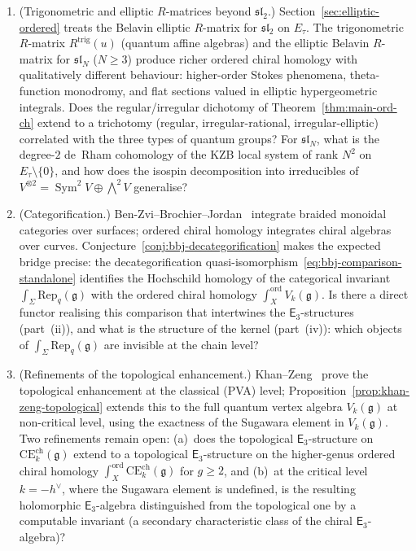\documentclass[11pt,reqno]{amsart}
\theoremstyle{definition}
\theoremstyle{remark}
\newcommand{\CE}{\mathrm{CE}}
\newcommand{\Ethree}{\mathsf{E}_{3}}
\newcommand{\fg}{\mathfrak{g}}
\numberwithin{equation}{section}
\begin{document}
\begin{enumerate}[label=\textup{(\alph*)}]
\item \textup{(Trigonometric and elliptic $R$-matrices
beyond $\mathfrak{sl}_2$.)}
Section~\ref{sec:elliptic-ordered} treats the Belavin
elliptic $R$-matrix for $\mathfrak{sl}_2$ on $E_\tau$.
The trigonometric $R$-matrix
$R^{\mathrm{trig}}(u)$ (quantum affine
algebras) and the elliptic Belavin $R$-matrix for
$\mathfrak{sl}_N$ ($N \geq 3$) produce richer ordered
chiral homology with qualitatively different behaviour:
higher-order Stokes phenomena, theta-function monodromy,
and flat sections valued in elliptic hypergeometric
integrals.
Does the regular/irregular dichotomy of
Theorem~\ref{thm:main-ord-ch} extend to a trichotomy
(regular, irregular-rational, irregular-elliptic)
correlated with the three types of quantum groups?
For $\mathfrak{sl}_N$, what is the degree-$2$ de~Rham
cohomology of the KZB local system of rank $N^2$ on
$E_\tau \setminus \{0\}$, and how does the isospin
decomposition into irreducibles of
$V^{\otimes 2} = \operatorname{Sym}^2 V \oplus
\bigwedge^2 V$ generalise?

\item \textup{(Categorification.)}
Ben-Zvi--Brochier--Jordan~\cite{BBJ15,BBJ16} integrate
braided monoidal categories over surfaces; ordered chiral
homology integrates chiral algebras over curves.
Conjecture~\ref{conj:bbj-decategorification} makes
the expected bridge precise: the decategorification
quasi-isomorphism~\eqref{eq:bbj-comparison-standalone}
identifies the Hochschild homology of the categorical
invariant $\int_\Sigma \mathrm{Rep}_q(\fg)$ with the
ordered chiral homology
$\int_X^{\mathrm{ord}} V_k(\fg)$.
Is there a direct functor realising this comparison
that intertwines the $\Ethree$-structures (part~(ii)),
and what is the structure of the kernel (part~(iv)):
which objects of $\int_\Sigma \mathrm{Rep}_q(\fg)$
are invisible at the chain level?

\item \textup{(Refinements of the topological enhancement.)}
Khan--Zeng~\cite{KhanZeng25} prove the topological
enhancement at the classical (PVA) level;
Proposition~\ref{prop:khan-zeng-topological} extends
this to the full quantum vertex algebra $V_k(\fg)$
at non-critical level, using the exactness of the
Sugawara element in $V_k(\fg)$.
Two refinements remain open: (a)~does the topological
$\Ethree$-structure on
$\CE^{\mathrm{ch}}_k(\fg)$ extend to a
topological $\Ethree$-structure on the higher-genus
ordered chiral homology
$\int_X^{\mathrm{ord}} \CE^{\mathrm{ch}}_k(\fg)$
for $g \geq 2$, and (b)~at the critical level
$k = -h^\vee$, where the Sugawara element is undefined,
is the resulting holomorphic $\Ethree$-algebra
distinguished from the topological one by a computable
invariant (a secondary characteristic class of the
chiral $\Ethree$-algebra)?

\end{enumerate}
\end{document}

